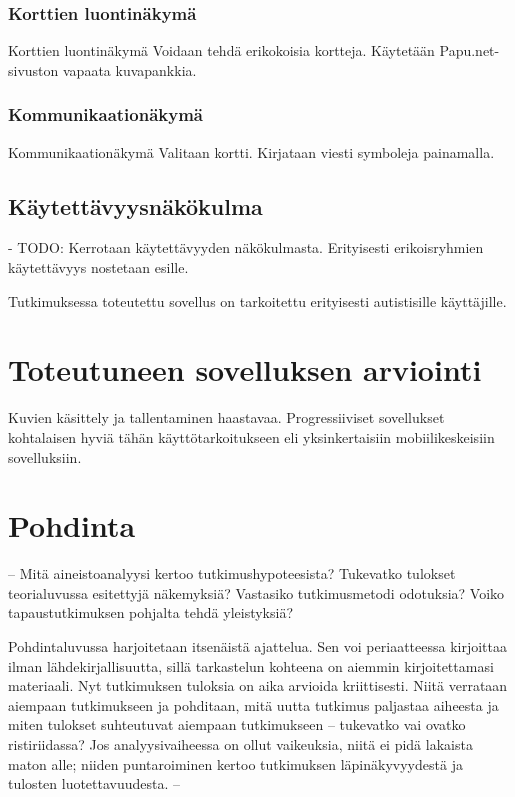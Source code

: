 \documentclass[utf8]{gradu3}
\begin{document}
\subsection{Korttien luontinäkymä}
Korttien luontinäkymä
Voidaan tehdä erikokoisia kortteja. Käytetään Papu.net-sivuston vapaata kuvapankkia.

\subsection{Kommunikaationäkymä}
Kommunikaationäkymä
Valitaan kortti. Kirjataan viesti symboleja painamalla.

\section{Käytettävyysnäkökulma}

- TODO: Kerrotaan käytettävyyden näkökulmasta. Erityisesti erikoisryhmien käytettävyys nostetaan esille.

Tutkimuksessa toteutettu sovellus on tarkoitettu erityisesti autistisille käyttäjille.

\chapter{Toteutuneen sovelluksen arviointi}

Kuvien käsittely ja tallentaminen haastavaa. Progressiiviset sovellukset kohtalaisen hyviä tähän käyttötarkoitukseen eli yksinkertaisiin mobiilikeskeisiin sovelluksiin.


\chapter{Pohdinta}

-- Mitä aineistoanalyysi kertoo tutkimushypoteesista? Tukevatko tulokset teorialuvussa esitettyjä näkemyksiä? Vastasiko tutkimusmetodi odotuksia? Voiko tapaustutkimuksen pohjalta tehdä yleistyksiä?

Pohdintaluvussa harjoitetaan itsenäistä ajattelua. Sen voi periaatteessa kirjoittaa ilman lähdekirjallisuutta, sillä tarkastelun kohteena on aiemmin kirjoitettamasi materiaali. Nyt tutkimuksen tuloksia on aika arvioida kriittisesti. Niitä verrataan aiempaan tutkimukseen ja pohditaan, mitä uutta tutkimus paljastaa aiheesta ja miten tulokset suhteutuvat aiempaan tutkimukseen – tukevatko vai ovatko ristiriidassa? Jos analyysivaiheessa on ollut vaikeuksia, niitä ei pidä lakaista maton alle; niiden puntaroiminen kertoo tutkimuksen läpinäkyvyydestä ja tulosten luotettavuudesta. --
\end{document}

